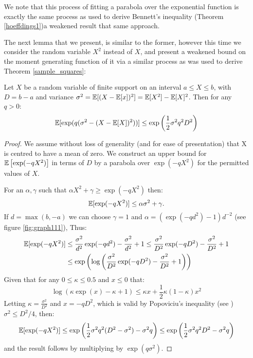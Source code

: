 We note that this process of fitting a parabola over the exponential function is exactly the same process as used to derive Bennett's inequality (Theorem \ref{hoeffdings1})\DIFdelbegin {}\DIFdelend \DIFaddbegin {}\DIFaddend a weakened result \DIFdelbegin {}\DIFdelend \DIFaddbegin {}\DIFaddend that same approach.

The next lemma that we present, is similar to the former, however this time we consider the random variable $X^2$ instead of $X$, and present a weakened bound on the moment generating function of it via a similar process as was used to derive Theorem \ref{sample_squares}: 

\begin{lemma}\label{expectation2}
Let $X$ be a random variable of finite support on an interval $a\le X\le b$, with $D=b-a$ and variance $\sigma^2 = \operatorname{\mathbb{E}}[(X-\operatorname{\mathbb{E}}[x])^2] = \operatorname{\mathbb{E}}[X^2]-\operatorname{\mathbb{E}}[X]^2$. Then for any $q>0$:
$$\operatorname{\mathbb{E}}[\exp(q(\sigma^2-(X-\operatorname{\mathbb{E}}[X])^2))] \le \exp\left(\frac{1}{2}\sigma^2q^2D^2\right)$$
\end{lemma}
\begin{proof}
We assume without loss of generality (and for ease of presentation) that X is centred to have a mean of zero.
We construct an upper bound for $\operatorname{\mathbb{E}}\left[\exp(-qX^2)\right]$ in terms of $D$ by a parabola over $\exp(-qX^2)$ for the permitted values of $X$.

For an $\alpha,\gamma$ such that $\alpha X^2+\gamma\ge \exp(-qX^2)$ then:
$$ \operatorname{\mathbb{E}}[\exp(-qX^2)] \le \alpha \sigma^2 + \gamma.$$
If $d=\max(b,-a)$ we can choose $\gamma=1$ and $\alpha=(\exp(-q d^2)-1)d^{-2}$ (see figure \ref{fig:graph111}), Thus:
\begin{align*}
\operatorname{\mathbb{E}}[\exp(-q X^2)] &\le \frac{\sigma^2}{d^2}\exp(-q d^2)-\frac{\sigma^2}{d^2} + 1\le \frac{\sigma^2}{D^2}\exp(-q D^2)-\frac{\sigma^2}{D^2} + 1 \\
&\le \exp\left(\log\left(\frac{\sigma^2}{D^2}\exp(-q D^2)-\frac{\sigma^2}{D^2} + 1\right)\right)
\end{align*}
Given that for any $0\le \kappa \le 0.5$ and $x\le 0$ that: $$\log\left(\kappa\exp(x)-\kappa + 1\right) \le \kappa x+\frac{1}{2}\kappa(1-\kappa)x^2$$
Letting $\kappa=\frac{\sigma^2}{D^2}$ and $x=-qD^2$, which is valid by Popoviciu's inequality (see \cite{zbMATH05780164}) $\sigma^2\le D^2/4$, then:
$$ \operatorname{\mathbb{E}}[\exp(-q X^2)] \le \exp\left(\frac{1}{2}\sigma^2q^2(D^2-\sigma^2)-\sigma^2q\right) \le \exp\left(\frac{1}{2}\sigma^2q^2D^2-\sigma^2q\right)$$
and the result follows by multiplying by $\exp(q\sigma^2)$.
\end{proof}

